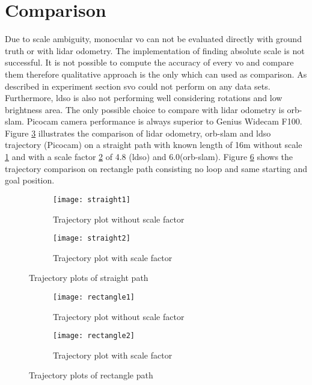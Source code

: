 \section{Comparison}
Due to scale ambiguity, monocular \acrshort{vo} can not be evaluated directly with ground truth or with \acrshort{lidar} odometry. The implementation of finding absolute scale is not successful. It is not possible to compute the accuracy of every \acrshort{vo} and compare them therefore qualitative approach is the only which can used as comparison. As described in experiment section \acrshort{svo} could not perform on any data sets. Furthermore, \acrshort{ldso} is also not performing well considering rotations and low brightness area. The only possible choice to compare with \acrshort{lidar} odometry is \acrshort{orb}-\acrshort{slam}. Picocam camera performance is always superior to Genius Widecam F100. Figure \ref{fig:straight} illustrates the comparison of \acrshort{lidar} odometry, \acrshort{orb}-\acrshort{slam} and \acrshort{ldso} trajectory (Picocam) on a straight path with known length of 16m without scale \ref{fig:straight1} and with a scale factor \ref{fig:straight2} of 4.8 (\acrshort{ldso}) and 6.0(\acrshort{orb}-\acrshort{slam}). Figure \ref{fig:rectangle} shows the trajectory comparison on rectangle path consisting no loop and same starting and goal position.   
\begin{figure}[H]
	\begin{subfigure}{.5\textwidth}
		\texttt{[image: straight1]}
		\caption{Trajectory plot without scale factor}
		\label{fig:straight1}
	\end{subfigure}
	\begin{subfigure}{.5\textwidth}
		\texttt{[image: straight2]}
		\caption{Trajectory plot with scale factor}
		\label{fig:straight2}
	\end{subfigure}
	\caption{Trajectory plots of straight path}
	\label{fig:straight}
\end{figure}

\begin{figure}[H]
	\begin{subfigure}{.5\textwidth}
		\texttt{[image: rectangle1]}
		\caption{Trajectory plot without scale factor}
		\label{fig:rectangle1}
	\end{subfigure}
	\begin{subfigure}{.5\textwidth}
		\texttt{[image: rectangle2]}
		\caption{Trajectory plot with scale factor}
		\label{fig:rectangle2}
	\end{subfigure}
	\caption{Trajectory plots of rectangle path}
	\label{fig:rectangle}
\end{figure}

